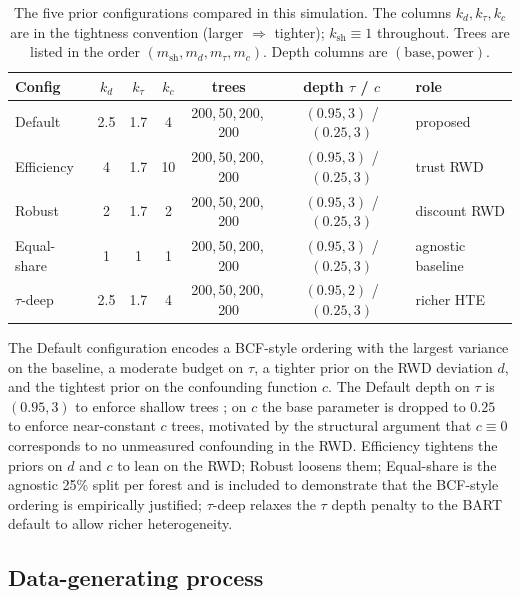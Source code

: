 \documentclass[11pt]{article}
\theoremstyle{plain}
\theoremstyle{definition}
\theoremstyle{remark}
\newcommand{\1}{\mathds{1}}
\begin{document}
\begin{table}[tb]
\centering
\small
\caption{The five prior configurations compared in this simulation. The
columns $k_d, k_\tau, k_c$ are in the tightness convention (larger
$\Rightarrow$ tighter); $k_{\mathrm{sh}} \equiv 1$ throughout. Trees are
listed in the order $(m_{\mathrm{sh}}, m_d, m_\tau, m_c)$. Depth columns
are $(\mathrm{base}, \mathrm{power})$.}
\label{tab:sim-prior-configs}
\begin{tabular}{lcccccl}
\toprule
Config       & $k_d$ & $k_\tau$ & $k_c$ & trees & depth $\tau$ / $c$ & role \\
\midrule
Default      & 2.5 & 1.7 & 4  & 200,\,50,\,200,\,200 & $(0.95, 3)$ / $(0.25, 3)$ & proposed          \\
Efficiency   & 4   & 1.7 & 10 & 200,\,50,\,200,\,200 & $(0.95, 3)$ / $(0.25, 3)$ & trust RWD         \\
Robust       & 2   & 1.7 & 2  & 200,\,50,\,200,\,200 & $(0.95, 3)$ / $(0.25, 3)$ & discount RWD      \\
Equal-share  & 1   & 1   & 1  & 200,\,50,\,200,\,200 & $(0.95, 3)$ / $(0.25, 3)$ & agnostic baseline \\
$\tau$-deep  & 2.5 & 1.7 & 4  & 200,\,50,\,200,\,200 & $(0.95, 2)$ / $(0.25, 3)$ & richer HTE        \\
\bottomrule
\end{tabular}
\end{table}

The Default configuration encodes a BCF-style ordering with the largest
variance on the baseline, a moderate budget on $\tau$, a tighter prior on
the RWD deviation $d$, and the tightest prior on the confounding function
$c$. The Default depth on $\tau$ is $(0.95, 3)$ to enforce shallow trees
\citep{hahn2020bayesian}; on $c$ the base parameter is dropped to $0.25$ to
enforce near-constant $c$ trees, motivated by the structural argument that
$c \equiv 0$ corresponds to no unmeasured confounding in the RWD.
Efficiency tightens the priors on $d$ and $c$ to lean on the RWD; Robust
loosens them; Equal-share is the agnostic 25\% split per forest and is
included to demonstrate that the BCF-style ordering is empirically
justified; $\tau$-deep relaxes the $\tau$ depth penalty to the BART default
to allow richer heterogeneity.

\subsection{Data-generating process}
\label{sec:sim-prior-dgp}
\end{document}
